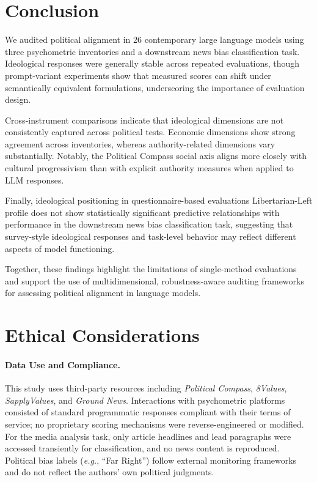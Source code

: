 \documentclass[11pt]{article}
\begin{document}
\section{Conclusion}

We audited political alignment in 26 contemporary large language models using three psychometric inventories and a downstream news bias classification task. Ideological responses were generally stable across repeated evaluations, though prompt-variant experiments show that measured scores can shift under semantically equivalent formulations, underscoring the importance of evaluation design.

Cross-instrument comparisons indicate that ideological dimensions are not consistently captured across political tests. Economic dimensions show strong agreement across inventories, whereas authority-related dimensions vary substantially. Notably, the Political Compass social axis aligns more closely with cultural progressivism than with explicit authority measures when applied to LLM responses.

Finally, ideological positioning in questionnaire-based evaluations Libertarian-Left profile does not show statistically significant predictive relationships with performance in the downstream news bias classification task, suggesting that survey-style ideological responses and task-level behavior may reflect different aspects of model functioning.

Together, these findings highlight the limitations of single-method evaluations and support the use of multidimensional, robustness-aware auditing frameworks for assessing political alignment in language models.



\section{Ethical Considerations}
\label{sec:ethics}

\paragraph{Data Use and Compliance.}
This study uses third-party resources including \textit{Political Compass}, \textit{8Values}, \textit{SapplyValues}, and \textit{Ground News}. Interactions with psychometric platforms consisted of standard programmatic responses compliant with their terms of service; no proprietary scoring mechanisms were reverse-engineered or modified. For the media analysis task, only article headlines and lead paragraphs were accessed transiently for classification, and no news content is reproduced. Political bias labels (\textit{e.g.}, ``Far Right'') follow external monitoring frameworks and do not reflect the authors’ own political judgments.
\end{document}
